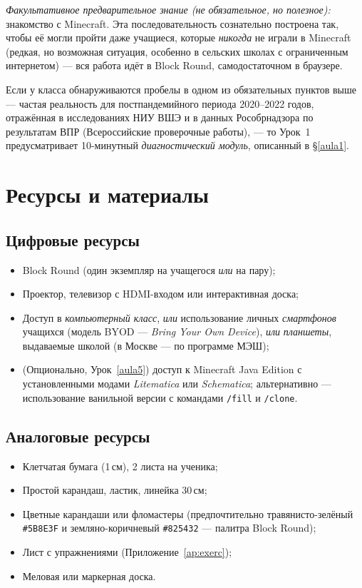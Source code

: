 \documentclass[12pt,a4paper]{scrartcl}
\newcommand{\cmd}[1]{\textcolor{earth}{\texttt{\small #1}}}
\begin{document}
\emph{Факультативное предварительное знание (не обязательное, но полезное):} знакомство с Minecraft. Эта последовательность сознательно построена так, чтобы её могли пройти даже учащиеся, которые \emph{никогда} не играли в Minecraft (редкая, но возможная ситуация, особенно в сельских школах с ограниченным интернетом) --- вся работа идёт в Block Round, самодостаточном в браузере.

Если у класса обнаруживаются пробелы в одном из обязательных пунктов выше --- частая реальность для постпандемийного периода 2020--2022 годов, отражённая в исследованиях НИУ ВШЭ и в данных Рособрнадзора по результатам ВПР (Всероссийские проверочные работы), --- то Урок~1 предусматривает 10-минутный \emph{диагностический модуль}, описанный в §\ref{aula1}.

\section{Ресурсы и материалы}\label{sec:recursos}

\subsection{Цифровые ресурсы}
\begin{itemize}[leftmargin=1.3em,itemsep=0.15em,topsep=0.3em]
  \item Block Round (один экземпляр на учащегося \emph{или} на пару);
  \item Проектор, телевизор с HDMI-входом или интерактивная доска;
  \item Доступ в \emph{компьютерный класс}, \emph{или} использование личных \emph{смартфонов} учащихся (модель BYOD --- \emph{Bring Your Own Device}), \emph{или} \emph{планшеты}, выдаваемые школой (в Москве --- по программе МЭШ);
  \item (Опционально, Урок~\ref{aula5}) доступ к Minecraft Java Edition с установленными модами \emph{Litematica} или \emph{Schematica}; альтернативно --- использование ванильной версии с командами \cmd{/fill} и \cmd{/clone}.
\end{itemize}

\subsection{Аналоговые ресурсы}
\begin{itemize}[leftmargin=1.3em,itemsep=0.15em,topsep=0.3em]
  \item Клетчатая бумага (1\,см), 2 листа на ученика;
  \item Простой карандаш, ластик, линейка 30\,см;
  \item Цветные карандаши или фломастеры (предпочтительно травянисто-зелёный \texttt{\#5B8E3F} и земляно-коричневый \texttt{\#825432} --- палитра Block Round);
  \item Лист с упражнениями (Приложение~\ref{ap:exerc});
  \item Меловая или маркерная доска.
\end{itemize}
\end{document}
